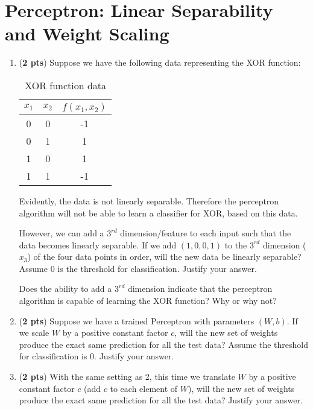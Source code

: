 \documentclass[11pt, letterpaper]{article}
\begin{document}
\section{Perceptron: Linear Separability and Weight Scaling}
\begin{enumerate}[label=(\alph*)]
\item (\textbf{2 pts}) Suppose we have the following data representing the XOR function:

    \begin{table}[h]
    \centering
    \begin{tabular}{|c|c|c|}
        \hline    
         $x_1$ & $x_2$ & $f(x_1,x_2)$ \\
        \hline
        0    & 0 & -1 \\
        0    & 1 & 1 \\
        1    & 0 & 1 \\
        1    & 1 & -1 \\        
        \hline
    \end{tabular}
    \caption{XOR function data}
    \label{tab:my_label}
    \end{table}
    
Evidently, the data is not linearly separable. Therefore the perceptron algorithm will not be able to learn a classifier for XOR, based on this data.

However, we can add a $3^{rd}$ dimension/feature to each input such that the data becomes linearly separable. If we add $(1, 0, 0, 1)$ to the $3^{rd}$ dimension ($x_3$) of the four data points in order, will the new data be linearly separable? Assume 0 is the threshold for classification. Justify your answer.

Does the ability to add a $3^{rd}$ dimension indicate that the perceptron algorithm is capable of learning the XOR function? Why or why not?

\bigskip

\item (\textbf{2 pts}) Suppose we have a trained Perceptron with parameters $(W, b)$. If we scale $W$ by a positive constant factor $c$, will the new set of weights produce the exact same prediction for all the test data? Assume the threshold for classification is 0. Justify your answer.

\bigskip

\item (\textbf{2 pts}) With the same setting as 2, this time we translate $W$ by a positive constant factor $c$ (add $c$ to each element of $W$), will the new set of weights produce the exact same prediction for all the test data? Justify your answer.\\
\bigskip 

\end{enumerate}
\end{document}
